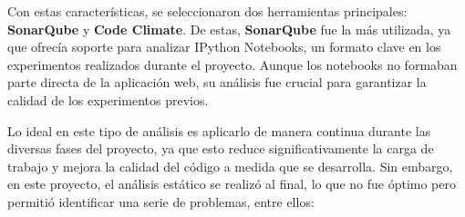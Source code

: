 Con estas características, se seleccionaron dos herramientas principales: \textbf{SonarQube} y \textbf{Code Climate}. De estas, \textbf{SonarQube} fue la más utilizada, ya que ofrecía soporte para analizar IPython Notebooks, un formato clave en los experimentos realizados durante el proyecto. Aunque los notebooks no formaban parte directa de la aplicación web, su análisis fue crucial para garantizar la calidad de los experimentos previos.

Lo ideal en este tipo de análisis es aplicarlo de manera continua durante las diversas fases del proyecto, ya que esto reduce significativamente la carga de trabajo y mejora la calidad del código a medida que se desarrolla. Sin embargo, en este proyecto, el análisis estático se realizó al final, lo que no fue óptimo pero permitió identificar una serie de problemas, entre ellos:

